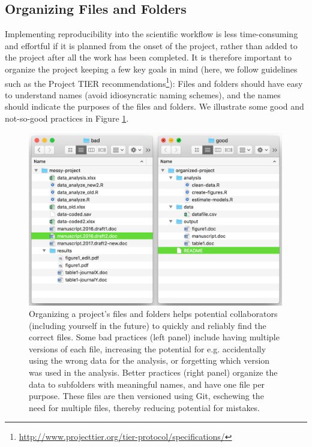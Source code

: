 \documentclass[
  american,
  ,doc,floatsintext]{apa6}
\begin{document}
\hypertarget{organizing-files-and-folders}{%
\subsection{Organizing Files and Folders}\label{organizing-files-and-folders}}

Implementing reproducibility into the scientific workflow is less time-consuming and effortful if it is planned from the onset of the project, rather than added to the project after all the work has been completed. It is therefore important to organize the project keeping a few key goals in mind (here, we follow guidelines such as the Project TIER recommendations\footnote{\url{http://www.projecttier.org/tier-protocol/specifications/}}): Files and folders should have easy to understand names (avoid idiosyncratic naming schemes), and the names should indicate the purposes of the files and folders. We illustrate some good and not-so-good practices in Figure \ref{fig:organizing-files}.

\begin{figure}

{\centering \includegraphics[width=4.4in]{images/project-organization} 

}

\caption{Organizing a project's files and folders helps potential collaborators (including yourself in the future) to quickly and reliably find the correct files. Some bad practices (left panel) include having multiple versions of each file, increasing the potential for e.g. accidentally using the wrong data for the analysis, or forgetting which version was used in the analysis. Better practices (right panel) organize the data to subfolders with meaningful names, and have one file per purpose. These files are then versioned using Git, eschewing the need for multiple files, thereby reducing potential for mistakes.}\label{fig:organizing-files}
\end{figure}
\end{document}

